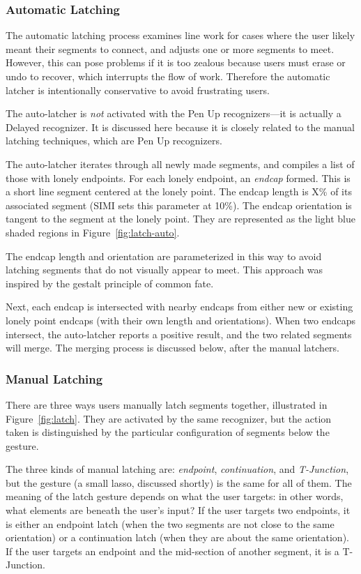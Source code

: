 \subsubsection{Automatic Latching}

The automatic latching process examines line work for cases where the
user likely meant their segments to connect, and adjusts one or more
segments to meet. However, this can pose problems if it is too zealous
because users must erase or undo to recover, which interrupts the flow
of work. Therefore the automatic latcher is intentionally conservative
to avoid frustrating users.

The auto-latcher is \textit{not} activated with the Pen Up
recognizers---it is actually a Delayed recognizer. It is discussed
here because it is closely related to the manual latching techniques,
which are Pen Up recognizers.

The auto-latcher iterates through all newly made segments, and
compiles a list of those with lonely endpoints. For each lonely
endpoint, an \textit{endcap} formed. This is a short line segment
centered at the lonely point. The endcap length is X\% of its
associated segment (SIMI sets this parameter at 10\%). The endcap
orientation is tangent to the segment at the lonely point. They are
represented as the light blue shaded regions in
Figure~\ref{fig:latch-auto}.

The endcap length and orientation are parameterized in this way to
avoid latching segments that do not visually appear to meet. This
approach was inspired by the gestalt principle of common fate.

Next, each endcap is intersected with nearby endcaps from either new
or existing lonely point endcaps (with their own length and
orientations). When two endcaps intersect, the auto-latcher reports a
positive result, and the two related segments will merge. The merging
process is discussed below, after the manual latchers.

\subsubsection{Manual Latching}

There are three ways users manually latch segments together,
illustrated in Figure~\ref{fig:latch}. They are activated by the same
recognizer, but the action taken is distinguished by the particular
configuration of segments below the gesture.

The three kinds of manual latching are: \textit{endpoint},
\textit{continuation}, and \textit{T-Junction}, but the gesture (a
small lasso, discussed shortly) is the same for all of them. The
meaning of the latch gesture depends on what the user targets: in
other words, what elements are beneath the user's input? If the user
targets two endpoints, it is either an endpoint latch (when the two
segments are not close to the same orientation) or a continuation
latch (when they are about the same orientation). If the user targets
an endpoint and the mid-section of another segment, it is a
T-Junction.

